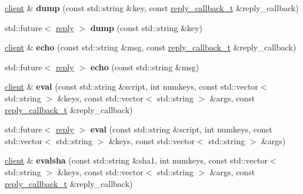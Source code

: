 \begin{DoxyCompactItemize}
\hyperlink{classcpp__redis_1_1client}{client} \& {\bfseries dump} (const std\+::string \&key, const \hyperlink{classcpp__redis_1_1client_a061a1140d36d2eaeda82b09a0bb3f9f2}{reply\+\_\+callback\+\_\+t} \&reply\+\_\+callback)
\item 
\mbox{\label{classcpp__redis_1_1client_aa25f7f2648c1a013ce079ef13e8e2f0f}} 
std\+::future$<$ \hyperlink{classcpp__redis_1_1reply}{reply} $>$ {\bfseries dump} (const std\+::string \&key)
\item 
\mbox{\label{classcpp__redis_1_1client_a285d35a355052ae1757d13ecec0539e8}} 
\hyperlink{classcpp__redis_1_1client}{client} \& {\bfseries echo} (const std\+::string \&msg, const \hyperlink{classcpp__redis_1_1client_a061a1140d36d2eaeda82b09a0bb3f9f2}{reply\+\_\+callback\+\_\+t} \&reply\+\_\+callback)
\item 
\mbox{\label{classcpp__redis_1_1client_af0e3462a35f72aeae1527f0cb3cc8570}} 
std\+::future$<$ \hyperlink{classcpp__redis_1_1reply}{reply} $>$ {\bfseries echo} (const std\+::string \&msg)
\item 
\mbox{\label{classcpp__redis_1_1client_aeb773d0e0cacb766a0c4c7641bd91ebf}} 
\hyperlink{classcpp__redis_1_1client}{client} \& {\bfseries eval} (const std\+::string \&script, int numkeys, const std\+::vector$<$ std\+::string $>$ \&keys, const std\+::vector$<$ std\+::string $>$ \&args, const \hyperlink{classcpp__redis_1_1client_a061a1140d36d2eaeda82b09a0bb3f9f2}{reply\+\_\+callback\+\_\+t} \&reply\+\_\+callback)
\item 
\mbox{\label{classcpp__redis_1_1client_a01b328b664e5cf604150e3d0f881ff4c}} 
std\+::future$<$ \hyperlink{classcpp__redis_1_1reply}{reply} $>$ {\bfseries eval} (const std\+::string \&script, int numkeys, const std\+::vector$<$ std\+::string $>$ \&keys, const std\+::vector$<$ std\+::string $>$ \&args)
\item 
\mbox{\label{classcpp__redis_1_1client_a71cd73130b4755c9f4da3b602b09a1be}} 
\hyperlink{classcpp__redis_1_1client}{client} \& {\bfseries evalsha} (const std\+::string \&sha1, int numkeys, const std\+::vector$<$ std\+::string $>$ \&keys, const std\+::vector$<$ std\+::string $>$ \&args, const \hyperlink{classcpp__redis_1_1client_a061a1140d36d2eaeda82b09a0bb3f9f2}{reply\+\_\+callback\+\_\+t} \&reply\+\_\+callback)

\end{DoxyCompactItemize}
